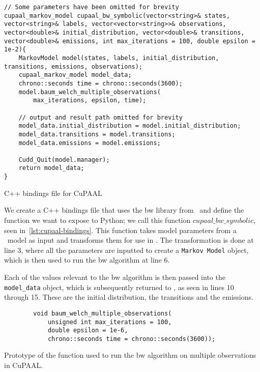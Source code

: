 \begin{listing}
    \begin{verbatim}
// Some parameters have been omitted for brevity
cupaal_markov_model cupaal_bw_symbolic(vector<string>& states, vector<string>& labels, vector<vector<string>>& observations, vector<double>& initial_distribution, vector<double>& transitions, vector<double>& emissions, int max_iterations = 100, double epsilon = 1e-2){
    MarkovModel model(states, labels, initial_distribution, transitions, emissions, observations);
    cupaal_markov_model model_data;
    chrono::seconds time = chrono::seconds(3600);
    model.baum_welch_multiple_observations(
        max_iterations, epsilon, time);

    // output and result path omitted for brevity
    model_data.initial_distribution = model.initial_distribution;
    model_data.transitions = model.transitions;
    model_data.emissions = model.emissions;
    
    Cudd_Quit(model.manager);
    return model_data;
}
      \end{verbatim}
    \caption{C++ bindings file for CuPAAL}
    \label{lst:cupaal-bindings}
\end{listing}

We create a C++ bindings file that uses the \gls{bw} library from \Cupaal\ and define the function we want to expose to Python; we call this function $cupaal\_bw\_symbolic$, seen in~\autoref{lst:cupaal-bindings}.
This function takes model parameters from a \Jajapy\ model as input and transforms them for use in \Cupaal.
The transformation is done at line 3, where all the parameters are inputted to create a \texttt{Markov Model} object, which is then used to run the \gls{bw} algorithm at line 6.

Each of the values relevant to the \gls{bw} algorithm is then passed into the \texttt{model\_data} object, which is subsequently returned to \Jajapy, as seen in lines 10 through 15. These are the initial distribution, the transitions and the emissions.


\begin{listing}
    \begin{verbatim}
        void baum_welch_multiple_observations(
            unsigned int max_iterations = 100, 
            double epsilon = 1e-6, 
            chrono::seconds time = chrono::seconds(3600));
        \end{verbatim}
    \caption{Prototype of the function used to run the \gls{bw} algorithm on multiple observations in CuPAAL.}
    \label{lst:baum-welch-multiple-observations}
\end{listing}


